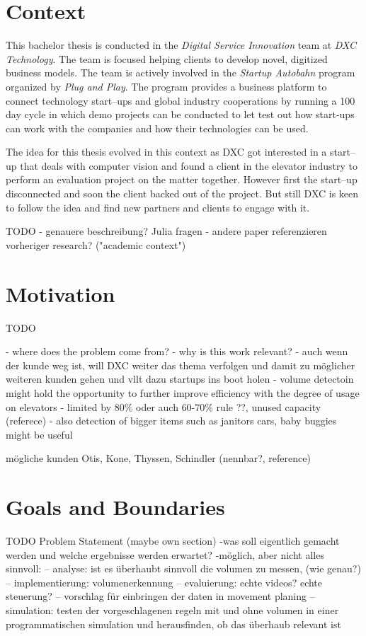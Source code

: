 \section{Context}

This bachelor thesis is conducted in the \emph{Digital Service Innovation} team at \emph{DXC Technology}.
The team is focused helping clients to develop novel, digitized business models.
The team is actively involved in the \emph{Startup Autobahn} program organized by \emph{Plug and Play}.
The program provides a business platform to connect technology start--ups and global industry cooperations 
by running a 100 day cycle in which demo projects can be conducted to let test out how start-ups can work with the companies and how their technologies can be used.

The idea for this thesis evolved in this context as DXC got interested in a start--up that deals with computer vision and found a client in the elevator industry to perform an evaluation project on the matter together.
However first the start--up disconnected and soon the client backed out of the project.
But still DXC is keen to follow the idea and find new partners and clients to engage with it.


TODO
- genauere beschreibung? Julia fragen
- andere paper referenzieren vorheriger research? ("academic context")


\section{Motivation}
TODO

- where does the problem come from?
- why is this work relevant?
- auch wenn der kunde weg ist, will DXC weiter das thema verfolgen und damit zu möglicher weiteren kunden gehen und vllt dazu startups ins boot holen
- volume detectoin might hold the opportunity to further improve efficiency with the degree of usage on elevators
- limited by 80\% oder auch 60-70\% rule ??, unused capacity (referece)
- also detection of bigger items such as janitors cars, baby buggies  might be useful


mögliche kunden Otis, Kone, Thyssen, Schindler (nennbar?, reference)

\section{Goals and Boundaries}

TODO Problem Statement (maybe own section)
-was soll eigentlich gemacht werden und welche ergebnisse werden erwartet?
-möglich, aber nicht alles sinnvoll: 
-- analyse: ist es überhaubt sinnvoll die volumen zu messen, (wie genau?)
-- implementierung: volumenerkennung
-- evaluierung: echte videos? echte steuerung?
-- vorschlag für einbringen der daten in movement planing
-- simulation: testen der vorgeschlagenen regeln mit und ohne volumen in einer programmatischen simulation und herausfinden, ob das überhaub relevant ist

